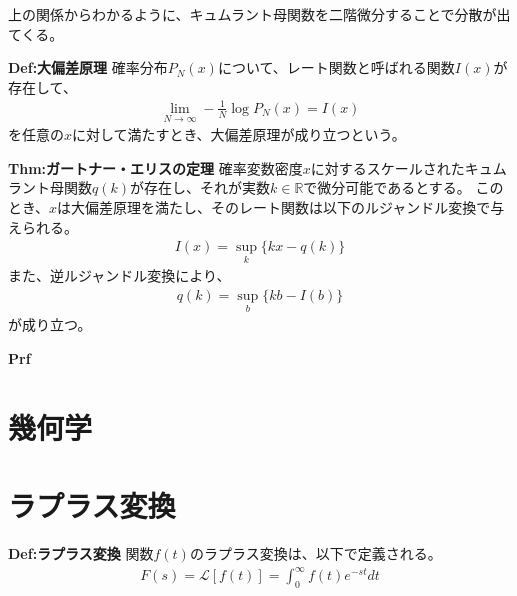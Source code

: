 \documentclass[a4paper,11pt]{jsarticle}
\numberwithin{equation}{section}
\begin{document}
上の関係からわかるように、キュムラント母関数を二階微分することで分散が出てくる。

\begin{itembox}[l]{\textbf{Def:大偏差原理}}
  確率分布$P_N(x)$について、レート関数と呼ばれる関数$I(x)$が存在して、
  \begin{align}
    \lim_{N \to \infty} -\frac{1}{N} \log P_N(x) = I(x)
  \end{align}
  を任意の$x$に対して満たすとき、大偏差原理が成り立つという。
\end{itembox}

\begin{itembox}[l]{\textbf{Thm:ガートナー・エリスの定理}}
  確率変数密度$x$に対するスケールされたキュムラント母関数$q(k)$が存在し、それが実数$k \in \mathbb{R}$で微分可能であるとする。
  このとき、$x$は大偏差原理を満たし、そのレート関数は以下のルジャンドル変換で与えられる。
  \begin{align}
    I(x) = \sup_{k} \{kx - q(k)\}
  \end{align}
  また、逆ルジャンドル変換により、
  \begin{align}
    q(k) = \sup_{b} \{kb - I(b)\}
  \end{align}
  が成り立つ。
\end{itembox}
\textbf{Prf}\\

\section{幾何学}

\section{ラプラス変換}
\begin{itembox}[l]{\textbf{Def:ラプラス変換}}
  関数$f(t)$のラプラス変換は、以下で定義される。
  \begin{align}
    F(s) = \mathcal{L}[f(t)] = \int_{0}^{\infty}  f(t) e^{-st} dt
  \end{align}

\end{itembox}
\end{document}
